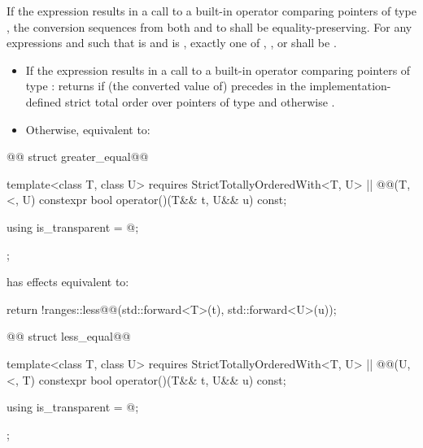 \begin{itemdescr}
\pnum
\expects
If the expression  results in a
call to a built-in operator \tcode{<} comparing pointers of type , the
conversion sequences from both  and  to  shall be
equality-preserving. For any expressions
 and  such that  is  and
 is , exactly one of
,
, or
shall be .

\pnum
\effects
\begin{itemize}
\item
If the expression  results in a
call to a built-in operator \tcode{<} comparing pointers of type :
returns  if (the converted value of)  precedes  in
the implementation-defined strict total order over pointers of type 
and otherwise .

\item
Otherwise, equivalent to:
\end{itemize}
\end{itemdescr}

\begin{itemdecl}
@@ struct greater_equal@@ {
  template<class T, class U>
    requires StrictTotallyOrderedWith<T, U> || @@(T, <, U)
  constexpr bool operator()(T&& t, U&& u) const;

  using is_transparent = @\unspecnc@;
};
\end{itemdecl}

\begin{itemdescr}
\pnum
{} has effects equivalent to:
\begin{codeblock}
return !ranges::less@\removed{<>}@{}(std::forward<T>(t), std::forward<U>(u));
\end{codeblock}
\end{itemdescr}

\begin{itemdecl}
@@ struct less_equal@@ {
  template<class T, class U>
    requires StrictTotallyOrderedWith<T, U> || @@(U, <, T)
  constexpr bool operator()(T&& t, U&& u) const;

  using is_transparent = @\unspecnc@;
};
\end{itemdecl}

